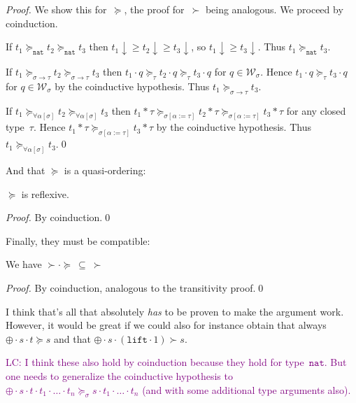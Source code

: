 \documentclass[runningheads,a4paper]{llncs}
\newcommand{\World}{\mathcal{W}}
\newcommand{\app}[2]{#1 \cdot #2}
\newcommand{\tapp}[2]{#1 * #2}
\newcommand{\subst}[2]{#1:=#2}
\newcommand{\nat}{\mathtt{nat}}
\newcommand{\lift}{\mathtt{lift}}
\newcommand{\da}{\downarrow}
\newcommand{\LC}[1]{\textcolor{purple}{LC: #1}}
\begin{document}
\begin{proof}
  We show this for~$\succeq$, the proof for~$\succ$ being
  analogous. We proceed by coinduction.

  If $t_1 \succeq_\nat t_2 \succeq_\nat t_3$ then
  $t_1\da \ge t_2\da \ge t_3\da$, so $t_1\da \ge t_3\da$. Thus
  $t_1 \succeq_\nat t_3$.

  If $t_1 \succeq_{\sigma\to\tau}t_2\succeq_{\sigma\to\tau}t_3$ then
  $\app{t_1}{q}\succeq_{\tau}\app{t_2}{q}\succeq_\tau\app{t_3}{q}$ for
  $q \in \World_\sigma$. Hence $\app{t_1}{q}\succeq_\tau\app{t_3}{q}$
  for $q \in \World_\sigma$ by the coinductive hypothesis. Thus
  $t_1\succeq_{\sigma\to\tau} t_3$.

  If $t_1 \succeq_{\forall\alpha[\sigma]}t_2\succeq_{\forall\alpha[\sigma]}t_3$ then
  $\tapp{t_1}{\tau}\succeq_{\sigma[\subst{\alpha}{\tau}]}\tapp{t_2}{\tau}\succeq_{\sigma[\subst{\alpha}{\tau}]}\tapp{t_3}{\tau}$ for
  any closed type~$\tau$. Hence
  $\tapp{t_1}{\tau}\succeq_{\sigma[\subst{\alpha}{\tau}]}\tapp{t_3}{\tau}$
  by the coinductive hypothesis. Thus $t_1\succeq_{\forall\alpha[\sigma]} t_3$.\qed
\end{proof}

And that $\succeq$ is a quasi-ordering:

\begin{lemma}
$\succeq$ is reflexive.
\end{lemma}

\begin{proof}
  By coinduction.\qed
\end{proof}

Finally, they must be compatible:

\begin{lemma}
We have $\succ \cdot \succeq\ \subseteq\ \succ$
\end{lemma}

\begin{proof}
By coinduction, analogous to the transitivity proof.\qed
\end{proof}

I think that's all that absolutely \emph{has} to be proven to make the
argument work.  However, it would be great if we could also for
instance obtain that always $\app{\app{\oplus}{s}}{t} \succeq s$ and
that $\app{\app{\oplus}{s}}{(\app{\lift}{1})} \succ s$.

\LC{I think these also hold by coinduction because they hold for
type~$\nat$. But one needs to generalize the coinductive hypothesis to
$\app{\app{\oplus}{s}}{t} \cdot t_1 \cdot \ldots \cdot t_n
\succeq_\sigma s \cdot t_1 \cdot \ldots \cdot t_n$ (and with some
additional type arguments also).}
\end{document}
